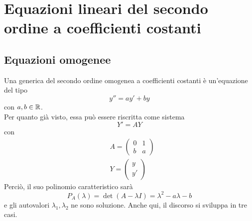\section{Equazioni lineari del secondo ordine a coefficienti costanti}
\subsection{Equazioni omogenee}
Una generica \ode del secondo ordine omogenea a coefficienti costanti è un'equazione del tipo
\begin{equation}
    y''=ay'+by
\end{equation}
con $a,b \in \mathbb{R}$.\\
Per quanto già visto, essa può essere riscritta come sistema
\begin{equation}
    Y'=AY
\end{equation}
con 
\begin{align}
    &A=\begin{pmatrix}
        0 & 1\\
        b & a
    \end{pmatrix}\\
    &Y=\begin{pmatrix}
        y\\
        y'
    \end{pmatrix}
\end{align}
Perciò, il suo polinomio caratteristico sarà
\begin{equation}
    P_A(\lambda)=\det(A-\lambda I) = \lambda^2-a\lambda-b
\end{equation}
e gli autovalori $\lambda_1, \lambda_2$ ne sono soluzione. Anche qui, il discorso si sviluppa in tre casi.
